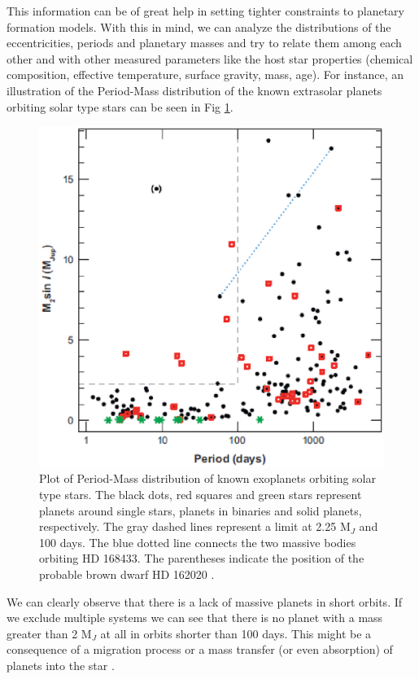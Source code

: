 \documentclass[dvips,12pt,a4paper]{report}
\begin{document}
This information can be of great help in setting tighter constraints to planetary formation models. With this in mind, we can analyze the distributions of the eccentricities, periods and planetary masses and try to relate them among each other and with other measured parameters like the host star properties (chemical composition, effective temperature, surface gravity, mass, age). For instance, an illustration of the Period-Mass distribution of the known extrasolar planets orbiting solar type stars can be seen in Fig \ref{planetmass}.

\begin{figure}[h]
\centering
\includegraphics[height=10 cm]{pics/massplanet2}
\caption[Period Mass distributions of known extrasolar planets ]{Plot of Period-Mass distribution of known exoplanets orbiting solar type stars. The black dots, red squares and green stars represent planets around single stars, planets in binaries and solid planets, respectively. The gray dashed lines represent a limit at 2.25 M$_{J}$ and 100 days. The blue dotted line connects the two massive bodies orbiting HD 168433. The parentheses indicate the position of the probable brown dwarf HD 162020 \citep{Udry-2007}. }
\label{planetmass}
\end{figure}

We can clearly observe that there is a lack of massive planets in short orbits. If we exclude multiple systems we can see that there is no planet with a mass greater than 2 M$_{J}$ at all in orbits shorter than 100 days. This might be a consequence of a migration process or a mass transfer (or even absorption) of planets into the star \citep[e.g.][]{Trilling-1998}. %
 
\end{document}
